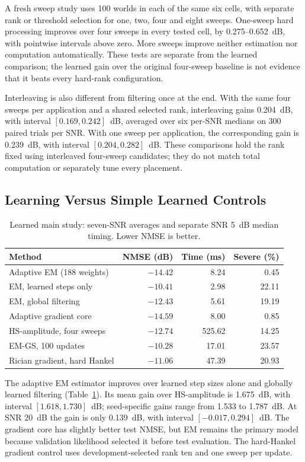 \documentclass[10pt,journal,letterpaper]{IEEEtran}
\begin{document}
A fresh sweep study uses 100 worlds in each of the same six cells, with separate rank or threshold selection for one, two, four and eight sweeps. One-sweep hard processing improves over four sweeps in every tested cell, by 0.275--0.652~dB, with pointwise intervals above zero. More sweeps improve neither estimation nor computation automatically. These tests are separate from the learned comparison; the learned gain over the original four-sweep baseline is not evidence that it beats every hard-rank configuration.

Interleaving is also different from filtering once at the end. With the same four sweeps per application and a shared selected rank, interleaving gains 0.204~dB, with interval $[0.169,0.242]$~dB, averaged over six per-SNR medians on 300 paired trials per SNR. With one sweep per application, the corresponding gain is 0.239~dB, with interval $[0.204,0.282]$~dB. These comparisons hold the rank fixed using interleaved four-sweep candidates; they do not match total computation or separately tune every placement.

\subsection{Learning Versus Simple Learned Controls}
\begin{table}[!t]
\caption{Learned main study: seven-SNR averages and separate SNR 5~dB median timing. Lower NMSE is better.}
\label{tab:learned}\centering\footnotesize\setlength{\tabcolsep}{3pt}
\begin{tabular}{@{}lrrr@{}}\toprule
Method & NMSE (dB) & Time (ms) & Severe (\%)\\\midrule
Adaptive EM (188 weights) & $-14.42$ & 8.24 & 0.45\\
EM, learned steps only & $-10.41$ & 2.98 & 22.11\\
EM, global filtering & $-12.43$ & 5.61 & 19.19\\
Adaptive gradient core & $-14.59$ & 8.00 & 0.85\\
HS-amplitude, four sweeps & $-12.74$ & 525.62 & 14.25\\
EM-GS, 100 updates & $-10.28$ & 17.01 & 23.57\\
Rician gradient, hard Hankel & $-11.06$ & 47.39 & 20.93\\\bottomrule
\end{tabular}
\end{table}
The adaptive EM estimator improves over learned step sizes alone and globally learned filtering (Table~\ref{tab:learned}). Its mean gain over HS-amplitude is 1.675~dB, with interval $[1.618,1.730]$~dB; seed-specific gains range from 1.533 to 1.787~dB. At SNR 20~dB the gain is only 0.139~dB, with interval $[-0.017,0.294]$~dB. The gradient core has slightly better test NMSE, but EM remains the primary model because validation likelihood selected it before test evaluation. The hard-Hankel gradient control uses development-selected rank ten and one sweep per update.
\end{document}
